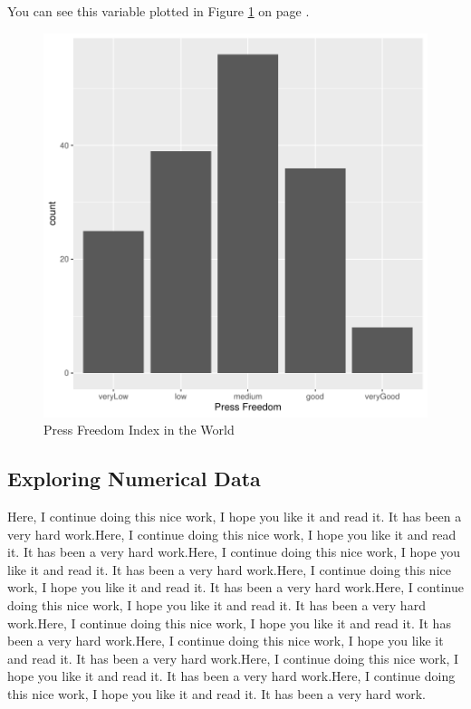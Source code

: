 \documentclass[11pt]{article}
\begin{document}

You can see this variable plotted in Figure \ref{cat_barplot} on page \pageref{cat_barplot}.



\begin{figure}[h]
\centering
\begin{adjustbox}{width=7cm,height=5cm} %
\includegraphics{WorkInR_forPrinter-cat_barplot}
\end{adjustbox}
\caption{Press Freedom Index in the World}  %
\label{cat_barplot} %
\end{figure}



\subsection{Exploring Numerical Data}\label{numexplo}

Here, I continue doing this nice work, I hope you like it and read it. It has been a very hard work.Here, I continue doing this nice work, I hope you like it and read it. It has been a very hard work.Here, I continue doing this nice work, I hope you like it and read it. It has been a very hard work.Here, I continue doing this nice work, I hope you like it and read it. It has been a very hard work.Here, I continue doing this nice work, I hope you like it and read it. It has been a very hard work.Here, I continue doing this nice work, I hope you like it and read it. It has been a very hard work.Here, I continue doing this nice work, I hope you like it and read it. It has been a very hard work.Here, I continue doing this nice work, I hope you like it and read it. It has been a very hard work.Here, I continue doing this nice work, I hope you like it and read it. It has been a very hard work.
\end{document}
